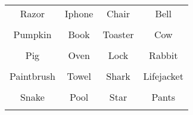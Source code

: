 \documentclass[12pt,a4paper]{article}
\begin{document}
\thispagestyle{empty}
\begin{table}[]
\centering
\Huge
\begin{tabular}{cccc}
 Razor& Iphone& Chair& Bell\\  & & & \\
 Pumpkin& Book& Toaster& Cow\\  & & & \\
 Pig& Oven& Lock& Rabbit\\  & & & \\
 Paintbrush& Towel& Shark& Lifejacket\\  & & & \\
 Snake& Pool& Star& Pants\\  & & & \\
\end{tabular}
\end{table}
\end{document}
